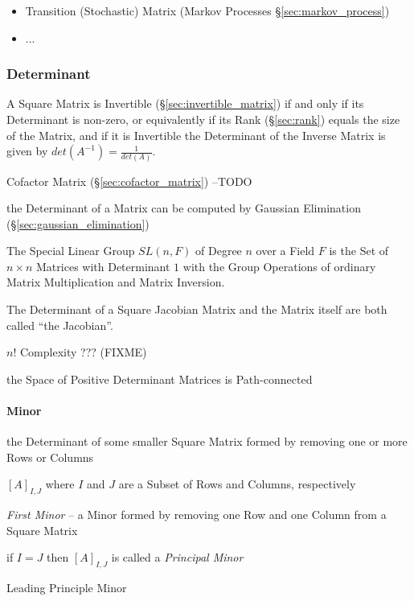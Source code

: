 \begin{itemize}
  \item Transition (Stochastic) Matrix (Markov Processes
    \S\ref{sec:markov_process})
  \item ...
\end{itemize}



\subsubsection{Determinant}\label{sec:determinant}

A Square Matrix is Invertible (\S\ref{sec:invertible_matrix}) if and only if
its Determinant is non-zero, or equivalently if its Rank (\S\ref{sec:rank})
equals the size of the Matrix, and if it is Invertible the Determinant of the
Inverse Matrix is given by $det(A^{-1}) = \frac{1}{det(A)}$.

Cofactor Matrix (\S\ref{sec:cofactor_matrix}) --TODO

\fist the Determinant of a Matrix can be computed by Gaussian Elimination
(\S\ref{sec:gaussian_elimination})

The Special Linear Group $SL(n,F)$ of Degree $n$ over a Field $F$ is the Set of
$n \times n$ Matrices with Determinant $1$ with the Group Operations of
ordinary Matrix Multiplication and Matrix Inversion.

The Determinant of a Square Jacobian Matrix and the Matrix itself are both
called ``the Jacobian''.

$n!$ Complexity ??? (FIXME)

the Space of Positive Determinant Matrices is Path-connected



\paragraph{Minor}\label{sec:minor}\hfill

the Determinant of some smaller Square Matrix formed by removing one or more
Rows or Columns

$[A]_{I,J}$ where $I$ and $J$ are a Subset of Rows and Columns, respectively

\emph{First Minor} -- a Minor formed by removing one Row and one Column from a
Square Matrix

if $I = J$ then $[A]_{I,J}$ is called a \emph{Principal Minor}

Leading Principle Minor

